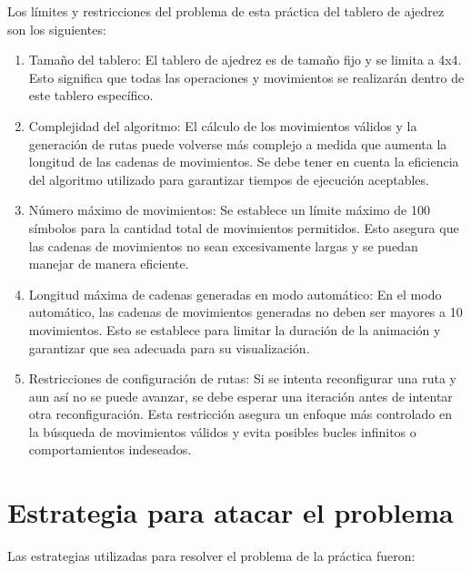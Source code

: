 Los límites y restricciones del problema de esta práctica del tablero de ajedrez son los siguientes:
\begin{enumerate}
    \item Tamaño del tablero: El tablero de ajedrez es de tamaño fijo y se limita a 4x4. Esto significa que todas las operaciones y movimientos se realizarán dentro de este tablero específico.\newline
    \item Complejidad del algoritmo: El cálculo de los movimientos válidos y la generación de rutas puede volverse más complejo a medida que aumenta la longitud de las cadenas de movimientos. Se debe tener en cuenta la eficiencia del algoritmo utilizado para garantizar tiempos de ejecución aceptables.\newline
    \item Número máximo de movimientos: Se establece un límite máximo de 100 símbolos para la cantidad total de movimientos permitidos. Esto asegura que las cadenas de movimientos no sean excesivamente largas y se puedan manejar de manera eficiente.\newline
    \item Longitud máxima de cadenas generadas en modo automático: En el modo automático, las cadenas de movimientos generadas no deben ser mayores a 10 movimientos. Esto se establece para limitar la duración de la animación y garantizar que sea adecuada para su visualización.\newline
    \item Restricciones de configuración de rutas: Si se intenta reconfigurar una ruta y aun así no se puede avanzar, se debe esperar una iteración antes de intentar otra reconfiguración. Esta restricción asegura un enfoque más controlado en la búsqueda de movimientos válidos y evita posibles bucles infinitos o comportamientos indeseados.\newline
    
\end{enumerate}

\section{Estrategia para atacar el problema}
Las estrategias utilizadas para resolver el problema de la práctica fueron:\newline

